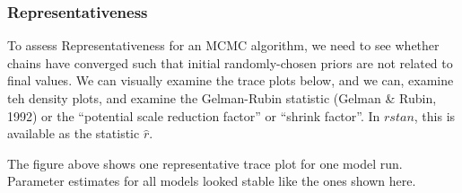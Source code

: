 \documentclass[]{article}
\begin{document}
\subsubsection{Representativeness}\label{representativeness}

To assess Representativeness for an MCMC algorithm, we need to see
whether chains have converged such that initial randomly-chosen priors
are not related to final values. We can visually examine the trace plots
below, and we can, examine teh density plots, and examine the
Gelman-Rubin statistic (Gelman \& Rubin, 1992) or the ``potential scale
reduction factor'' or ``shrink factor''. In \(rstan\), this is available
as the statistic \(\widehat{r}\).

The figure above shows one representative trace plot for one model run.
Parameter estimates for all models looked stable like the ones shown
here.
\end{document}
